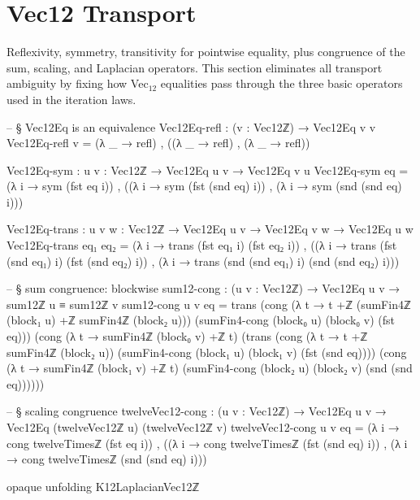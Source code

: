 \documentclass[11pt,a4paper]{book}
\def\texorpdfstring#1#2{#2}%
\begin{document}
\section{Vec\texorpdfstring{$_{12}$}{12} Transport}

Reflexivity, symmetry, transitivity for pointwise equality, plus congruence
of the sum, scaling, and Laplacian operators.  This section eliminates all
transport ambiguity by fixing how Vec$_{12}$ equalities pass through the three
basic operators used in the iteration laws.

\begin{code}
-- § Vec12Eq is an equivalence
Vec12Eq-refl : (v : Vec12ℤ) → Vec12Eq v v
Vec12Eq-refl v = (λ _ → refl) , ((λ _ → refl) , (λ _ → refl))

Vec12Eq-sym : {u v : Vec12ℤ} → Vec12Eq u v → Vec12Eq v u
Vec12Eq-sym eq =
  (λ i → sym (fst eq i)) ,
  ((λ i → sym (fst (snd eq) i)) ,
   (λ i → sym (snd (snd eq) i)))

Vec12Eq-trans : {u v w : Vec12ℤ} → Vec12Eq u v → Vec12Eq v w → Vec12Eq u w
Vec12Eq-trans eq₁ eq₂ =
  (λ i → trans (fst eq₁ i) (fst eq₂ i)) ,
  ((λ i → trans (fst (snd eq₁) i) (fst (snd eq₂) i)) ,
   (λ i → trans (snd (snd eq₁) i) (snd (snd eq₂) i)))

-- § sum congruence: blockwise
sum12-cong : (u v : Vec12ℤ) → Vec12Eq u v → sum12ℤ u ≡ sum12ℤ v
sum12-cong u v eq =
  trans
    (cong (λ t → t +ℤ (sumFin4ℤ (block₁ u) +ℤ sumFin4ℤ (block₂ u)))
         (sumFin4-cong (block₀ u) (block₀ v) (fst eq)))
    (cong (λ t → sumFin4ℤ (block₀ v) +ℤ t)
      (trans
        (cong (λ t → t +ℤ sumFin4ℤ (block₂ u))
              (sumFin4-cong (block₁ u) (block₁ v) (fst (snd eq))))
        (cong (λ t → sumFin4ℤ (block₁ v) +ℤ t)
              (sumFin4-cong (block₂ u) (block₂ v) (snd (snd eq))))))

-- § scaling congruence
twelveVec12-cong : (u v : Vec12ℤ) → Vec12Eq u v → Vec12Eq (twelveVec12ℤ u) (twelveVec12ℤ v)
twelveVec12-cong u v eq =
  (λ i → cong twelveTimesℤ (fst eq i)) ,
  ((λ i → cong twelveTimesℤ (fst (snd eq) i)) ,
   (λ i → cong twelveTimesℤ (snd (snd eq) i)))

opaque
  unfolding K12LaplacianVec12ℤ


\end{code}
\end{document}
